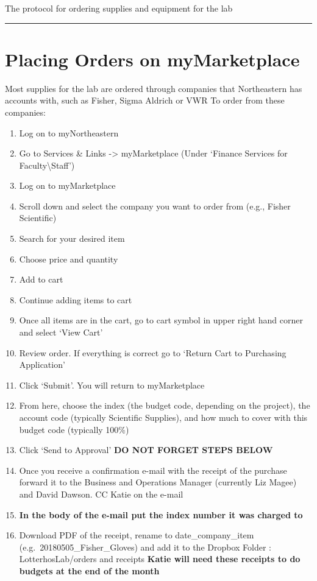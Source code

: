 \documentclass[
  letterpaper,
  DIV=11,
  numbers=noendperiod]{scrreprt}
\begin{document}
The protocol for ordering supplies and equipment for the lab

\begin{center}\rule{0.5\linewidth}{0.5pt}\end{center}

\hypertarget{placing-orders-on-mymarketplace}{%
\section*{\texorpdfstring{\textbf{Placing Orders on
myMarketplace}}{Placing Orders on myMarketplace}}\label{placing-orders-on-mymarketplace}}

Most supplies for the lab are ordered through companies that
Northeastern has accounts with, such as Fisher, Sigma Aldrich or VWR To
order from these companies:

\begin{enumerate}
\def\labelenumi{\arabic{enumi}.}
\item
  Log on to myNortheastern
\item
  Go to Services \& Links -\textgreater{} myMarketplace (Under `Finance
  Services for Faculty\textbackslash Staff')
\item
  Log on to myMarketplace
\item
  Scroll down and select the company you want to order from (e.g.,
  Fisher Scientific)
\item
  Search for your desired item
\item
  Choose price and quantity
\item
  Add to cart
\item
  Continue adding items to cart
\item
  Once all items are in the cart, go to cart symbol in upper right hand
  corner and select `View Cart'
\item
  Review order. If everything is correct go to `Return Cart to
  Purchasing Application'
\item
  Click `Submit'. You will return to myMarketplace
\item
  From here, choose the index (the budget code, depending on the
  project), the account code (typically Scientific Supplies), and how
  much to cover with this budget code (typically 100\%)
\item
  Click `Send to Approval' \textbf{DO NOT FORGET STEPS BELOW}
\item
  Once you receive a confirmation e-mail with the receipt of the
  purchase forward it to the Business and Operations Manager (currently
  Liz Magee) and David Dawson. CC Katie on the e-mail
\item
  \textbf{In the body of the e-mail put the index number it was charged
  to}
\item
  Download PDF of the receipt, rename to date\_company\_item
  (e.g.~20180505\_Fisher\_Gloves) and add it to the Dropbox Folder :
  LotterhosLab/orders and receipts \textbf{Katie will need these
  receipts to do budgets at the end of the month}
\end{enumerate}
\end{document}

